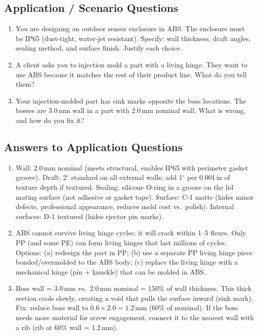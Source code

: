 \documentclass[11pt,letterpaper,twoside,openany]{book}
\providecommand{\ang}[1]{#1\ensuremath{{}^{\circ}}}
\begin{document}




\subsection{Application / Scenario Questions}
\begin{enumerate}[leftmargin=1.5em, start=7]
\item You are designing an outdoor sensor enclosure in ABS. The enclosure must be IP65 (dust-tight, water-jet resistant). Specify: wall thickness, draft angles, sealing method, and surface finish. Justify each choice.
\item A client asks you to injection mold a part with a living hinge. They want to use ABS because it matches the rest of their product line. What do you tell them?
\item Your injection-molded part has sink marks opposite the boss locations. The bosses are 3.0\,mm wall in a part with 2.0\,mm nominal wall. What is wrong, and how do you fix it?
\end{enumerate}

\subsection{Answers to Application Questions}
\begin{enumerate}[leftmargin=1.5em, start=7]
\item Wall: 2.0\,mm nominal (meets structural, enables IP65 with perimeter gasket groove). Draft: \ang{2} standard on all external walls; add \ang{1} per 0.001\,in of texture depth if textured. Sealing: silicone O-ring in a groove on the lid mating surface (not adhesive or gasket tape). Surface: C-1 matte (hides minor defects, professional appearance, reduces mold cost vs.\ polish). Internal surfaces: D-1 textured (hides ejector pin marks).
\item ABS cannot survive living hinge cycles; it will crack within 1--5 flexes. Only PP (and some PE) can form living hinges that last millions of cycles. Options: (a) redesign the part in PP; (b) use a separate PP living hinge piece bonded/overmolded to the ABS body; (c) replace the living hinge with a mechanical hinge (pin + knuckle) that can be molded in ABS.
\item Boss wall = 3.0\,mm vs.\ 2.0\,mm nominal = 150\% of wall thickness. This thick section cools slowly, creating a void that pulls the surface inward (sink mark). Fix: reduce boss wall to $0.6 \times 2.0 = 1.2$\,mm (60\% of nominal). If the boss needs more material for screw engagement, connect it to the nearest wall with a rib (rib at 60\% wall = 1.2\,mm).
\end{enumerate}
\end{document}
